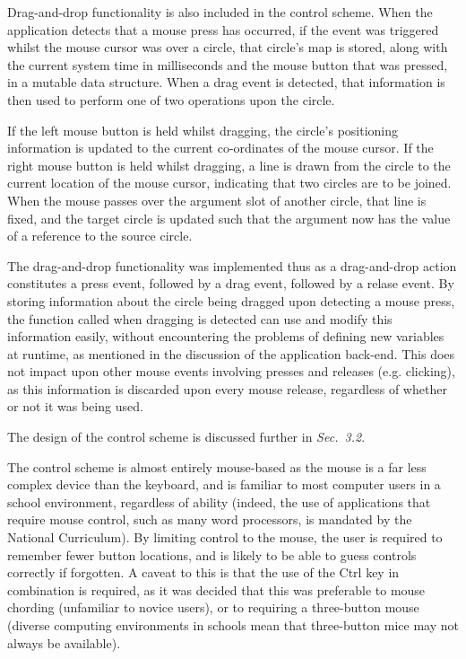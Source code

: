 \documentclass[12pt,twoside,notitlepage,xetex]{report}
\begin{document}
Drag-and-drop functionality is also included in the control scheme.  When the application detects that a mouse press has occurred, if the event was triggered whilst the mouse cursor was over a circle, that circle's map is stored, along with the current system time in milliseconds and the mouse button that was pressed, in a mutable data structure.  When a drag event is detected, that information is then used to perform one of two operations upon the circle.

If the left mouse button is held whilst dragging, the circle's positioning information is updated to the current co-ordinates of the mouse cursor.  If the right mouse button is held whilst dragging, a line is drawn from the circle to the current location of the mouse cursor, indicating that two circles are to be joined.  When the mouse passes over the argument slot of another circle, that line is fixed, and the target circle is updated such that the argument now has the value of a reference to the source circle.

The drag-and-drop functionality was implemented thus as a drag-and-drop action constitutes a press event, followed by a drag event, followed by a relase event.  By storing information about the circle being dragged upon detecting a mouse press, the function called when dragging is detected can use and modify this information easily, without encountering the problems of defining new variables at runtime, as mentioned in the discussion of the application back-end.  This does not impact upon other mouse events involving presses and releases (e.g. clicking), as this information is discarded upon every mouse release, regardless of whether or not it was being used.

The design of the control scheme is discussed further in \emph{Sec.~3.2}. %

The control scheme is almost entirely mouse-based as the mouse is a far less complex device than the keyboard, and is familiar to most computer users in a school environment, regardless of ability (indeed, the use of applications that require mouse control, such as many word processors, is mandated by the National Curriculum).  By limiting control to the mouse, the user is required to remember fewer button locations, and is likely to be able to guess controls correctly if forgotten.  A caveat to this is that the use of the Ctrl key in combination is required, as it was decided that this was preferable to mouse chording (unfamiliar to novice users), or to requiring a three-button mouse (diverse computing environments in schools mean that three-button mice may not always be available).
\end{document}
